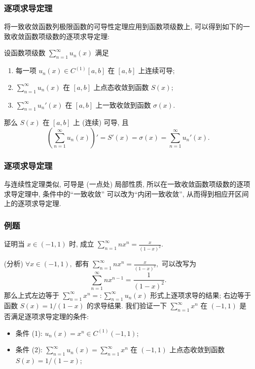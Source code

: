 
\begin{frame}
\frametitle{逐项求导定理}

将一致收敛函数列极限函数的可导性定理应用到函数项级数上, 可以得到如下的一致收敛函数项级数的逐项求导定理:

\begin{thm}[一致收敛函数项级数的逐项求导定理]
设函数项级数 $\displaystyle \sum_{n=1}^\infty u_n(x)$ 满足
\begin{enumerate}
\item 每一项 $u_n(x) \in C^{(1)}[a, b]$ 在 $[a, b]$ 上连续可导;
\item $\sum_{n=1}^\infty u_n(x)$ 在 $[a, b]$ 上点态收敛到函数 $S(x);$
\item $\sum_{n=1}^\infty u_n'(x)$ 在 $[a, b]$ 上一致收敛到函数 $\sigma(x).$
\end{enumerate}
那么 $S(x)$ 在 $[a, b]$ 上 (连续) 可导, 且
\[
\left( \sum_{n=1}^\infty u_n(x) \right)' = S'(x) = \sigma(x) = \sum_{n=1}^\infty u_n'(x).
\]
\end{thm}

\end{frame}


\begin{frame}
\frametitle{逐项求导定理}

\begin{remark}
与连续性定理类似, 可导是 (一点处) 局部性质, 所以在一致收敛函数项级数的逐项求导定理中, 条件中的``一致收敛'' 可以改为``\alert{内闭一致收敛}'', 从而得到相应\alert{开区间}上的逐项求导定理.
\end{remark}

\end{frame}


\begin{frame}
\frametitle{例题}

\begin{eg}
证明当 $x \in (-1, 1)$ 时, 成立 $\displaystyle \sum_{n=1}^\infty n x^{n} = \frac{x}{(1 - x)^2}.$
\end{eg}

\pause
\vspace{0.5em}

\startproof[bg=yellow, fg=red](分析)
$\forall x \in (-1, 1),$ 都有 $\displaystyle \sum_{n=1}^\infty n x^{n} = \frac{x}{(1 - x)^2},$ 可以改写为
\[\sum_{n=1}^\infty n x^{n-1} = \frac{1}{(1 - x)^2}.\]
那么上式左边等于 $\sum_{n=1}^\infty x^n =: \sum_{n=1}^\infty u_n(x)$ 形式上逐项求导的结果; 右边等于函数 $S(x) = 1/(1 - x)$ 的求导结果.
\pause
我们验证一下 $\sum_{n=1}^\infty x^n$ 在 $(-1, 1)$ 是否满足逐项求导定理的条件:
\begin{itemize}
\item 条件 (1): $u_n(x) = x^n \in C^{(1)}(-1, 1)$;
\item 条件 (2): $\sum_{n=1}^\infty u_n(x) = \sum_{n=1}^\infty x^n$ 在 $(-1, 1)$ 上点态收敛到函数 $S(x) = 1/(1 - x)$;
\end{itemize}

\end{frame}


